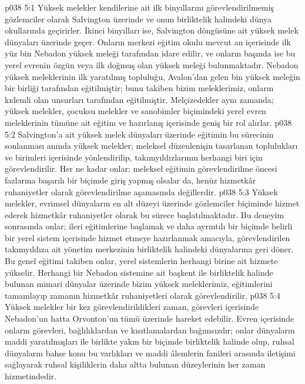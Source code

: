 \vs p038 5:1 Yüksek melekler kendilerine ait ilk binyıllarını görevlendirilmemiş gözlemciler olarak Salvington üzerinde ve onun birliktelik halindeki dünya okullarında geçirirler. İkinci binyılları ise, Salvington döngüsüne ait yüksek melek dünyaları üzerinde geçer. Onların merkezi eğitim okulu mevcut an içerisinde ilk yüz bin Nebadon yüksek meleği tarafından idare edilir, ve onların başında ise bu yerel evrenin özgün veya ilk doğmuş olan yüksek meleği bulunmaktadır. Nebadon yüksek meleklerinin ilk yaratılmış topluluğu, Avalon’dan gelen bin yüksek meleğin bir birliği tarafından eğitilmiştir; bunu takiben bizim meleklerimiz, onların kıdemli olan unsurları tarafından eğitilmiştir. Melçizedekler aynı zamanda; yüksek melekler, çocuksu melekler ve sanobimler biçimindeki yerel evren meleklerinin tümüne ait eğitim ve hazırlanış içerisinde geniş bir rol alırlar.
\vs p038 5:2 Salvington’a ait yüksek melek dünyaları üzerinde eğitimin bu sürecinin sonlanması anında yüksek melekler; meleksel düzenlenişin tasarlanan toplulukları ve birimleri içerisinde yönlendirilip, takımyıldızlarının herhangi biri için görevlendirilir. Her ne kadar onlar; meleksel eğitimin görevlendirilme öncesi fazlarına başarılı bir biçimde giriş yapmış olsalar da, henüz hizmetkâr ruhaniyetler olarak görevlendirilme aşamasında değillerdir.
\vs p038 5:3 Yüksek melekler, evrimsel dünyaların en alt düzeyi üzerinde gözlemciler biçiminde hizmet ederek hizmetkâr ruhaniyetler olarak bu sürece başlatılmaktadır. Bu deneyim sonrasında onlar; ileri eğitimlerine başlamak ve daha ayrıntılı bir biçimde belirli bir yerel sistem içerisinde hizmet etmeye hazırlanmak amacıyla, görevlendirilen takımyıldıza ait yönetim merkezinin birliktelik halindeki dünyalarına geri döner. Bu genel eğitimi takiben onlar, yerel sistemlerin herhangi birine ait hizmete yükselir. Herhangi bir Nebadon sistemine ait başkent ile birliktelik halinde bulunan mimari dünyalar üzerinde bizim yüksek meleklerimiz, eğitimlerini tamamlayıp zamanın hizmetkâr ruhaniyetleri olarak görevlendirilir.
\vs p038 5:4 Yüksek melekler bir kez görevlendirildikleri zaman, görevleri içerisinde Nebadon’un hatta Orvonton’un tümü üzerinde hareket edebilir. Evren içerisinde onların görevleri, bağlılıklardan ve kısıtlamalardan bağımsızdır; onlar dünyaların maddi yaratılmışları ile birlikte yakın bir biçimde birliktelik halinde olup, ruhsal dünyaların bahse konu bu varlıkları ve maddi âlemlerin fanileri arasında iletişimi sağlayarak ruhsal kişiliklerin daha altta bulunan düzeylerinin her zaman hizmetindedir.
